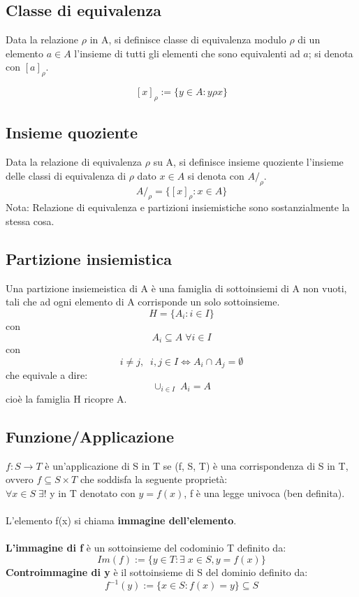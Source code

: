 \subsection{Classe di equivalenza} 
Data la relazione \(\rho\) in A, si definisce classe di equivalenza modulo \(\rho\) di un elemento \(a \in A\) l'insieme di tutti gli elementi che sono equivalenti ad \(a\); si denota con \([a]_\rho\).

\[[x]_\rho :=\{y\in A : y\rho x\} \]

\subsection{Insieme quoziente} 
Data la relazione di equivalenza \(\rho\) su A, si definisce insieme quoziente l'insieme delle classi di equivalenza di \(\rho\) dato \(x\in A\) si denota con \(A/_\rho\).
\[A/_\rho = \{[x]_\rho : x \in A \} \]
\newline
Nota: Relazione di equivalenza e partizioni insiemistiche sono sostanzialmente la stessa cosa.

\subsection{Partizione insiemistica} 
Una partizione insiemeistica di A è una famiglia di sottoinsiemi di A non vuoti, tali che ad ogni elemento di A corrisponde un solo sottoinsieme.
\[H = \{A_i : i \in I \} \] con \[A_i \subseteq A\; \forall i \in I\]
con
\[i \neq j,\;\; i,j \in I \Leftrightarrow A_i \cap A_j=\emptyset \]
che equivale a dire:
\[\cup_{i\in I} \; A_i = A\]
cioè la famiglia H ricopre A.

\subsection{Funzione/Applicazione} 
\(f:S\rightarrow T\) è un'applicazione di S in T se (f, S, T) è una corrispondenza di S in T, ovvero \(f\subseteq S\times T\) che soddisfa la seguente proprietà:
\\
\(\forall x \in S \; \exists !\) y in T denotato con \(y=f(x)\), f è una legge univoca (ben definita).
\\\\
L'elemento f(x) si chiama \textbf{immagine dell'elemento}.
\\\\
\textbf{L'immagine di f} è un sottoinsieme del codominio T definito da:
\[Im(f) := \{y \in T : \exists\; x \in S, y=f(x)\}\]
\newline
\textbf{Controimmagine di y} è il sottoinsieme di S del dominio definito da:
\[f^{-1}(y):=\{x\in S:f(x)=y\}\subseteq S\]

